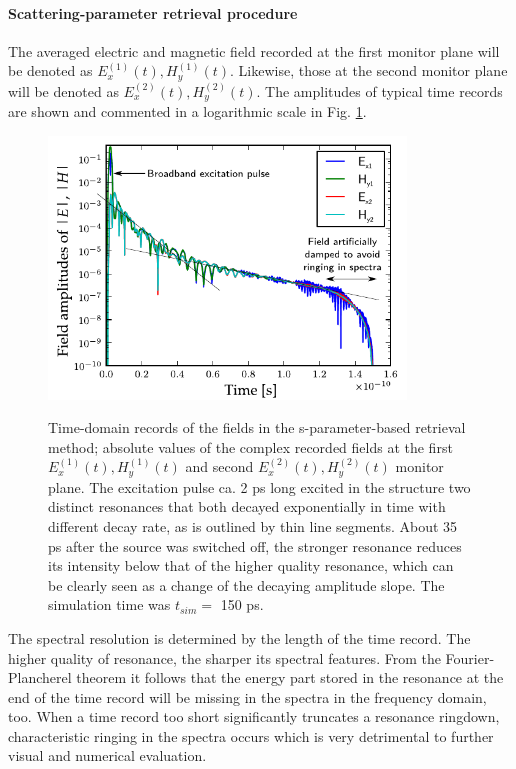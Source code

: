 \paragraph{Scattering-parameter retrieval procedure} %
The averaged electric and magnetic field recorded at the first monitor plane will be denoted as $E_{x}^{(1)}(t), H_{y}^{(1)}(t)$. Likewise, those at the second monitor plane will be denoted as $E_{x}^{(2)}(t), H_{y}^{(2)}(t)$. The amplitudes of typical time records are shown and commented in a logarithmic scale in Fig. \ref{fg_sparam_timedomain}.  
\begin{figure}[ht] \centering \caption{Time-domain records of the fields in the s-parameter-based retrieval method; absolute values of the complex recorded fields at the first $E_{x}^{(1)}(t), H_{y}^{(1)}(t)$ and second $E_{x}^{(2)}(t), H_{y}^{(2)}(t)$ monitor plane.  The excitation pulse ca. 2 ps long excited in the structure two distinct resonances that both decayed exponentially in time with different decay rate, as is outlined by thin line segments. About 35 ps after the source was switched off, the stronger resonance reduces its intensity below that of the higher quality resonance, which can be clearly seen as a change of the decaying amplitude slope. The simulation time  was $t_{sim} =$ 150 ps.} \includegraphics[width=9.5cm]{img/sim_timedomain_debug.pdf} \label{fg_sparam_timedomain} \end{figure}

The spectral resolution is determined by the length of the time record. The higher quality of resonance, the sharper its spectral features. %
From the Fourier-Plancherel theorem %
it follows that the energy part stored in the resonance at the end of the time record will be missing in the spectra in the frequency domain, too. When a time record too short significantly truncates a resonance ringdown, characteristic ringing in the spectra occurs which is very detrimental to further visual and numerical evaluation. 

